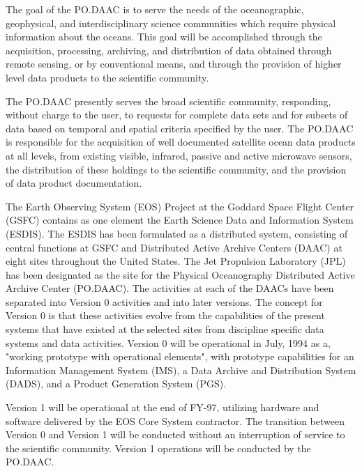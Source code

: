 \medskip
\large
{}
\normalsize
\medskip

	The goal of the PO.DAAC is to serve the needs of the oceanographic, 
geophysical, and interdisciplinary science communities which require 
physical information about the oceans.  This goal will be accomplished 
through the acquisition, processing, archiving, and distribution of data 
obtained through remote sensing, or by conventional means, and through 
the provision of higher level data products to the scientific community.

	The PO.DAAC presently serves the broad scientific community, 
responding, without charge to the user, to requests for complete data sets 
and for subsets of data based on temporal and spatial criteria specified by 
the user. The PO.DAAC is responsible for the acquisition of well 
documented satellite ocean data products at all levels, from existing 
visible, infrared, passive and active microwave sensors, the distribution 
of these holdings to the scientific community, and the provision of data 
product documentation.

	The Earth Observing System (EOS) Project at the Goddard Space 
Flight Center (GSFC) contains as one element the Earth Science Data and 
Information System (ESDIS).  The ESDIS has been formulated as a 
distributed system, consisting of central functions at GSFC and 
Distributed Active Archive Centers (DAAC) at eight sites throughout the 
United States.  The Jet Propulsion Laboratory (JPL) has been designated as 
the site for the Physical Oceanography Distributed Active Archive Center 
(PO.DAAC).  The activities at each of the DAACs have been separated into 
Version 0 activities and into later versions.  The concept for Version 0 is 
that these activities evolve from the capabilities of the present systems 
that have existed at the selected sites from discipline specific data 
systems and data activities.  Version 0 will be operational in July, 1994 
as a, "working prototype with operational elements", with prototype 
capabilities for an Information Management System (IMS), a Data Archive 
and Distribution System (DADS), and a Product Generation System (PGS).   

	Version 1 will be operational at the end of FY-97, utilizing hardware 
and software delivered by the EOS Core System contractor.  The transition 
between Version 0 and Version 1 will be conducted without an 
interruption of service to the scientific community.  Version 1 operations 
will be conducted by the PO.DAAC.

